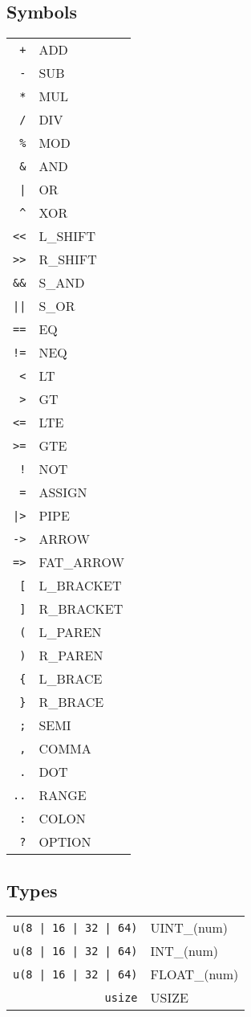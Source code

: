 \documentclass{article}
\begin{document}
		\subsection{Symbols}
			\begin{tabular}{rl}
				\texttt{+} & ADD\\
				\texttt{-} & SUB\\
				\texttt{*} & MUL\\
				\texttt{/} & DIV\\
				\texttt{\%} & MOD\\
				\texttt{\&} & AND\\
				\texttt{|} & OR\\
				\texttt{\^} & XOR\\
				\texttt{<<} & L\_SHIFT\\
				\texttt{>>} & R\_SHIFT\\
				\texttt{\&\&} & S\_AND\\
				\texttt{||} & S\_OR\\
				\texttt{==} & EQ\\
				\texttt{!=} & NEQ\\
				\texttt{<} & LT\\
				\texttt{>} & GT\\
				\texttt{<=} & LTE\\
				\texttt{>=} & GTE\\
				\texttt{!} & NOT\\
				\texttt{=} & ASSIGN\\
				\texttt{|>} & PIPE\\
				\texttt{->} & ARROW\\
				\texttt{=>} & FAT\_ARROW\\
				\texttt{[} & L\_BRACKET\\
				\texttt{]} & R\_BRACKET\\
				\texttt{(} & L\_PAREN\\
				\texttt{)} & R\_PAREN\\
				\texttt{\{} & L\_BRACE\\
				\texttt{\}} & R\_BRACE\\
				\texttt{;} & SEMI\\
				\texttt{,} & COMMA\\
				\texttt{.} & DOT\\
				\texttt{..} & RANGE\\
				\texttt{:} & COLON\\
				\texttt{?} & OPTION\\
			\end{tabular}
		\subsection{Types}	
			\begin{tabular}{rl}
				\texttt{u(8 | 16 | 32 | 64)} & UINT\_(num)\\
				\texttt{u(8 | 16 | 32 | 64)} & INT\_(num)\\
				\texttt{u(8 | 16 | 32 | 64)}  & FLOAT\_(num)\\
				\texttt{usize} & USIZE\\ 
			\end{tabular}
\end{document}
